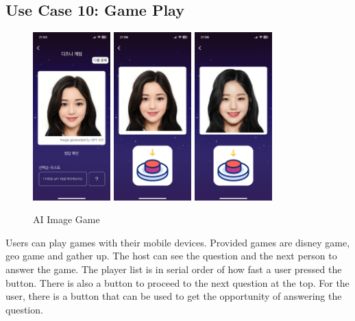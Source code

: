 \documentclass[conference]{IEEEtran}
\begin{document}
    \subsection{Use Case 10: Game Play}
        \begin{figure}[htbp]
            \centerline{\includegraphics[width=3cm]{Images/screen/game/disney/DISNEY4_HOST.PNG}
            \includegraphics[width=3cm]{Images/screen/game/disney/DISNEY4_PLAYER.PNG}
             \includegraphics[width=3cm]{Images/screen/game/disney/DISNEY4_PLAYER_ANSWER.PNG}}
            \caption{AI Image Game}
            \label{fig}
        \end{figure}
        Users can play games with their mobile devices. Provided games are disney game, geo game and gather up. The host can see the question and the next person to answer the game. The player list is in serial order of how fast a user pressed the button. There is also a button to proceed to the next question at the top. For the user, there is a button that can be used to get the opportunity of answering the question.\\
\end{document}
